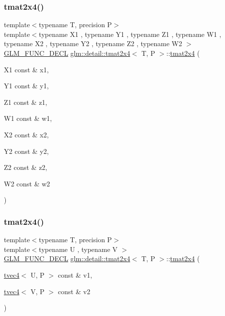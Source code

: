\subsubsection{\texorpdfstring{tmat2x4()}{tmat2x4()}\hspace{0.1cm}{\footnotesize\ttfamily [8/22]}}
{\footnotesize\ttfamily template$<$typename T, precision P$>$ \\
template$<$typename X1 , typename Y1 , typename Z1 , typename W1 , typename X2 , typename Y2 , typename Z2 , typename W2 $>$ \\
\hyperlink{setup_8hpp_ab2d052de21a70539923e9bcbf6e83a51}{G\+L\+M\+\_\+\+F\+U\+N\+C\+\_\+\+D\+E\+CL} \hyperlink{structglm_1_1detail_1_1tmat2x4}{glm\+::detail\+::tmat2x4}$<$ T, P $>$\+::\hyperlink{structglm_1_1detail_1_1tmat2x4}{tmat2x4} (\begin{DoxyParamCaption}\item[{X1 const \&}]{x1,  }\item[{Y1 const \&}]{y1,  }\item[{Z1 const \&}]{z1,  }\item[{W1 const \&}]{w1,  }\item[{X2 const \&}]{x2,  }\item[{Y2 const \&}]{y2,  }\item[{Z2 const \&}]{z2,  }\item[{W2 const \&}]{w2 }\end{DoxyParamCaption})}

\mbox{\label{structglm_1_1detail_1_1tmat2x4_a83ae4e28845c271611c3c4a41d9afb83}} 
\subsubsection{\texorpdfstring{tmat2x4()}{tmat2x4()}\hspace{0.1cm}{\footnotesize\ttfamily [9/22]}}
{\footnotesize\ttfamily template$<$typename T, precision P$>$ \\
template$<$typename U , typename V $>$ \\
\hyperlink{setup_8hpp_ab2d052de21a70539923e9bcbf6e83a51}{G\+L\+M\+\_\+\+F\+U\+N\+C\+\_\+\+D\+E\+CL} \hyperlink{structglm_1_1detail_1_1tmat2x4}{glm\+::detail\+::tmat2x4}$<$ T, P $>$\+::\hyperlink{structglm_1_1detail_1_1tmat2x4}{tmat2x4} (\begin{DoxyParamCaption}\item[{\hyperlink{structglm_1_1detail_1_1tvec4}{tvec4}$<$ U, P $>$ const \&}]{v1,  }\item[{\hyperlink{structglm_1_1detail_1_1tvec4}{tvec4}$<$ V, P $>$ const \&}]{v2 }\end{DoxyParamCaption})}

